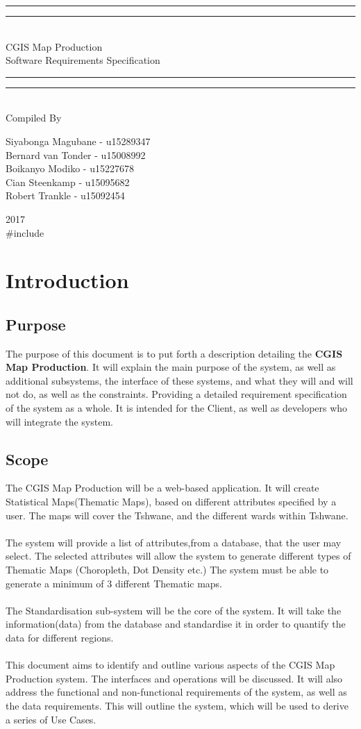 \documentclass{article}
\newcommand*{\titleGP}{\begingroup
\centering 
\vspace*{\baselineskip}

\rule{\textwidth}{1.6pt}\vspace*{-\baselineskip}\vspace*{2pt}
\rule{\textwidth}{0.4pt}\\[\baselineskip]

{\LARGE CGIS Map Production\\ [0.3\baselineskip] Software Requirements Specification } \\ [0.2\baselineskip]
\rule{\textwidth}{0.4pt}\vspace*{-\baselineskip}\vspace{3.2pt}
\rule{\textwidth}{1.6pt}\\[\baselineskip] %



Compiled By \\[\baselineskip]
{\Large Siyabonga Magubane - u15289347 \\ Bernard van Tonder -  u15008992 \\ Boikanyo Modiko - u15227678 \\ Cian Steenkamp - u15095682 \\ Robert Trankle - u15092454\par} 

\vfill

{\scshape 2017} \\[0.3\baselineskip]
{\large \#include}\par

\endgroup}
\begin{document}
\titleGP

\newpage
	
	\section{Introduction}
    	
        \subsection{Purpose}
        	{The purpose of this document is to put forth a description detailing the \textbf{CGIS Map Production}. It will explain the main purpose of the system, as well as additional subsystems, the interface of these systems, and what they will and will not do, as well as the constraints. Providing a detailed requirement specification of the system as a whole. It is intended for the Client, as well as developers who will integrate the system.}
    	\subsection{Scope}
{The CGIS Map Production will be a web-based application. It will create Statistical Maps(Thematic Maps), based on different attributes specified by a user. The maps will cover the Tshwane, and the different wards within Tshwane.\\\\
The system will provide a list of attributes,from a database, that the user may select. The selected attributes will allow the system to generate different types of Thematic Maps (Choropleth, Dot Density etc.) The system must be able to generate a minimum of 3 different Thematic maps.\\\\
The Standardisation sub-system will be the core of the system. It will take the information(data) from the database and standardise it in order to quantify the data for different regions.\\\\
This document aims to identify and outline various aspects of the CGIS Map Production system. The interfaces and operations will be discussed. It will also address the functional and non-functional requirements of the system, as well as the data requirements. This will outline the system, which will be used to derive a series of Use Cases.}
\end{document}
